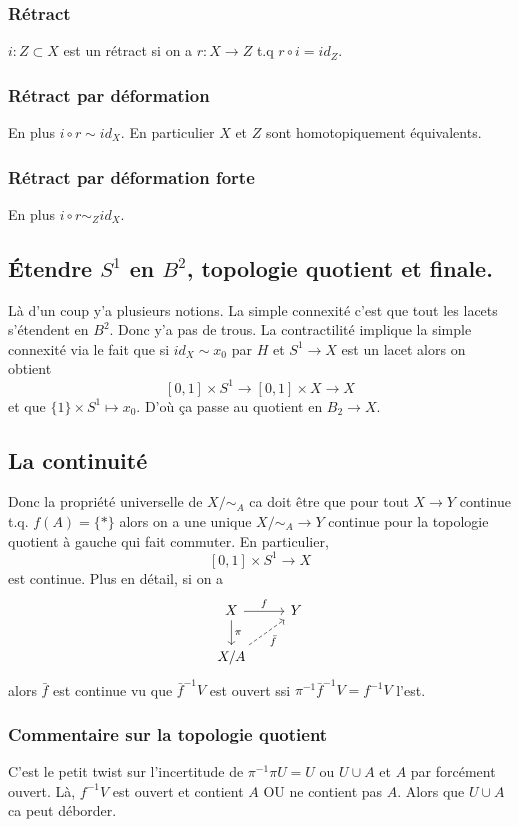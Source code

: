 \documentclass[a4paper,12pt]{book}
\theoremstyle{plain}
\theoremstyle{definition}
\theoremstyle{remark}
\begin{document}
\subsubsection{Rétract}
$i\colon Z\subset X$ est un rétract si on a $r\colon X\to Z$
t.q $r\circ i= id_Z$. 

\subsubsection{Rétract par déformation}
En plus $i\circ r\sim id_X$. En particulier 
$X$ et $Z$ sont homotopiquement équivalents.
\subsubsection{Rétract par déformation forte}
En plus $i\circ r\sim_Z id_X$.


\subsection{Étendre $S^1$ en $B^2$, topologie quotient et finale.}
Là d'un coup y'a plusieurs notions. La simple connexité c'est
que tout les lacets s'étendent en $B^2$. Donc y'a pas de trous.
La contractilité implique la simple connexité via le fait que
si $id_X\sim x_0$ par $H$ et $S^1\to X$ est un lacet alors on
obtient 
\[[0,1]\times S^1\to [0,1]\times X\to X\]
et que $\{1\}\times S^1\mapsto x_0$. D'où ça passe au quotient
en $B_2\to X$.
\subsection{La continuité}
Donc la propriété universelle de $X/\sim_A$ ca doit être que
pour tout $X\to Y$ continue t.q. $f(A)=\{*\}$ alors on a une
unique $X/\sim_A\to Y$ continue pour la topologie quotient à
gauche qui fait commuter. En particulier, 
\[[0,1]\times S^1\to X\]
est continue. Plus en détail, si on a 
\[\begin{tikzcd}
	X & Y \\
	{X/A}
	\arrow["f", from=1-1, to=1-2]
	\arrow["\pi", from=1-1, to=2-1]
	\arrow["{\bar f}"', dashed, from=2-1, to=1-2]
\end{tikzcd}\]
alors $\bar f$ est continue vu que $\bar f^{-1}V$ est ouvert
ssi $\pi^{-1}\bar f^{-1} V=f^{-1}V$ l'est.

\subsubsection{Commentaire sur la topologie quotient}
C'est le petit twist sur l'incertitude de $\pi^{-1}\pi U=U$ ou
$U\cup A$ et $A$ par forcément ouvert. Là, $f^{-1} V$ est ouvert
et contient $A$ OU ne contient pas $A$. Alors que $U\cup A$
ca peut déborder.
\end{document}
